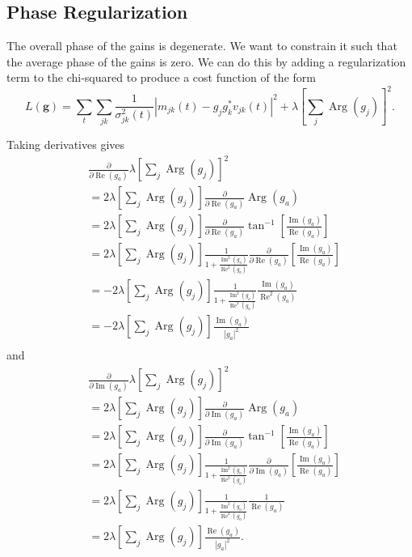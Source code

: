 \documentclass{article}
\newcommand\re{\operatorname{Re}}
\newcommand\im{\operatorname{Im}}
\begin{document}
\subsection{Phase Regularization}
\label{s:phase_regularization}

The overall phase of the gains is degenerate. We want to constrain it such that the average phase of the gains is zero. We can do this by adding a regularization term to the chi-squared to produce a cost function of the form
\begin{equation}
    L(\boldsymbol{g}) = \sum_t \sum_{jk} \frac{1}{\sigma_{jk}^2(t)} \left| m_{jk}(t) - g_j g_k^* v_{jk}(t) \right|^2 + \lambda \left[ \sum_j \operatorname{Arg}(g_j) \right]^2.
\end{equation}

Taking derivatives gives
\begin{align}
    &\frac{\partial}
    {\partial \re(g_a)} \lambda \left[ \sum_j \operatorname{Arg}(g_j) \right]^2 \\
    &= 2 \lambda \left[ \sum_j \operatorname{Arg}(g_j) \right] \frac{\partial}
    {\partial \re(g_a)} \operatorname{Arg}(g_a) \\
    &= 2 \lambda \left[ \sum_j \operatorname{Arg}(g_j) \right] \frac{\partial}
    {\partial \re(g_a)} \tan^{-1} \left[ \frac{\im(g_a)}{\re(g_a)} \right] \\
    &= 2 \lambda \left[ \sum_j \operatorname{Arg}(g_j) \right] \frac{1}{1+\frac{\im^2(g_a)}{\re^2(g_a)}} \frac{\partial}
    {\partial \re(g_a)} \left[ \frac{\im(g_a)}{\re(g_a)} \right] \\
    &= -2 \lambda \left[ \sum_j \operatorname{Arg}(g_j) \right] \frac{1}{1+\frac{\im^2(g_a)}{\re^2(g_a)}} \frac{\im(g_a)}{\re^2(g_a)} \\
    &= -2 \lambda \left[ \sum_j \operatorname{Arg}(g_j) \right] \frac{\im(g_a)}{|g_a|^2} \\
\end{align}
and
\begin{align}
    &\frac{\partial}
    {\partial \im(g_a)} \lambda \left[ \sum_j \operatorname{Arg}(g_j) \right]^2 \\
    &= 2 \lambda \left[ \sum_j \operatorname{Arg}(g_j) \right] \frac{\partial}
    {\partial \im(g_a)} \operatorname{Arg}(g_a) \\
    &= 2 \lambda \left[ \sum_j \operatorname{Arg}(g_j) \right] \frac{\partial}
    {\partial \im(g_a)} \tan^{-1} \left[ \frac{\im(g_a)}{\re(g_a)} \right] \\
    &= 2 \lambda \left[ \sum_j \operatorname{Arg}(g_j) \right] \frac{1}{1+\frac{\im^2(g_a)}{\re^2(g_a)}} \frac{\partial}
    {\partial \im(g_a)} \left[ \frac{\im(g_a)}{\re(g_a)} \right] \\
    &= 2 \lambda \left[ \sum_j \operatorname{Arg}(g_j) \right] \frac{1}{1+\frac{\im^2(g_a)}{\re^2(g_a)}} \frac{1}{\re(g_a)} \\
    &= 2 \lambda \left[ \sum_j \operatorname{Arg}(g_j) \right] \frac{\re(g_a)}{|g_a|^2}. \\
\end{align}
\end{document}
